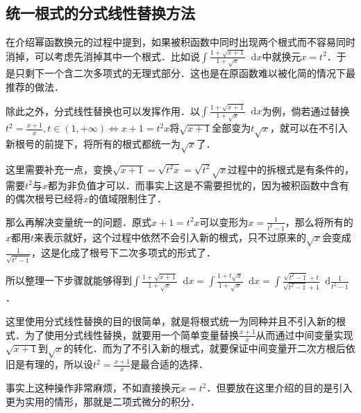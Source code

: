 \documentclass{ctexbook}
\newcommand*{\dif}{\mathop{}\!\mathrm{d}}
\begin{document}
\subsection{统一根式的分式线性替换方法}
在介绍幂函数换元的过程中提到，如果被积函数中同时出现两个根式而不容易同时消掉，可以考虑先消掉其中一个根式．比如说$\int\frac{1+\sqrt{x+1}}{1+\sqrt{x}}\dif{x}$中就换元$x=t^{2}$．于是只剩下一个含二次多项式的无理式部分．这也是在原函数难以被化简的情况下最推荐的做法．\par
除此之外，分式线性替换也可以发挥作用．以$\int\frac{1+\sqrt{x+1}}{1+\sqrt{x}}\dif{x}$为例，倘若通过替换$t^{2}=\frac{x+1}{x},t\in\left(1,+\infty\right)\Leftrightarrow x+1=t^{2}x$将$\sqrt{x+1}$全部变为$t\sqrt{x}$，就可以在不引入新根号的前提下，将所有的根式都统一为$\sqrt{x}$了．\par
这里需要补充一点，变换$\sqrt{x+1}=\sqrt{t^{2}x}=\sqrt{t^{2}}\sqrt{x}$过程中的拆根式是有条件的，需要$t^{2}$与$x$都为非负值才可以．而事实上这是不需要担忧的，因为被积函数中含有的偶次根号已经将$x$的值域限制住了．\par
那么再解决变量统一的问题．原式$x+1=t^{2}x$可以变形为$x=\frac{1}{t^{2}-1}$，那么将所有的$x$都用$t$来表示就好，这个过程中依然不会引入新的根式，只不过原来的$\sqrt{x}$会变成$\frac{1}{\sqrt{t^{2}-1}}$，这是化成了根号下二次多项式的形式了．\par
所以整理一下步骤就能够得到$\int\frac{1+\sqrt{x+1}}{1+\sqrt{x}}\dif{x}=\int\frac{1+t\sqrt{x}}{1+\sqrt{x}}\dif{x}=\int\frac{\sqrt{t^{2}-1}+t}{\sqrt{t^{2}-1}+1}\dif{\frac{1}{t^{2}-1}}$．\par
这里使用分式线性替换的目的很简单，就是将根式统一为同种并且不引入新的根式．为了使用分式线性替换，就要用一个简单变量替换$\frac{x+1}{x}$从而通过中间变量实现$\sqrt{x+1}$到$\sqrt{x}$的转化．而为了不引入新的根式，就要保证中间变量开二次方根后依旧是有理的，所以设$t^{2}=\frac{x+1}{x}$是最合适的选择．\par
事实上这种操作非常麻烦，不如直接换元$x=t^{2}$．但要放在这里介绍的目的是引入更为实用的情形，那就是二项式微分的积分．\par
\end{document}
